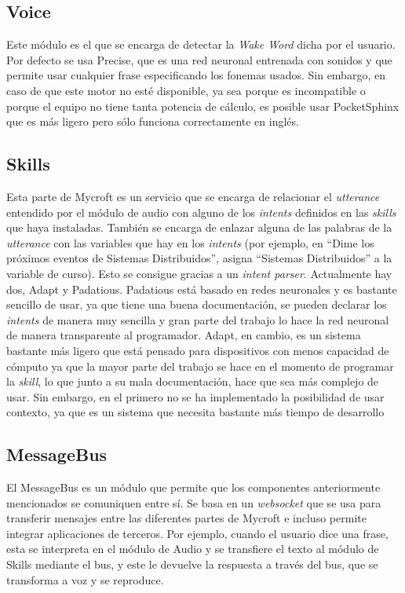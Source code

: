 \subsection{Voice}
Este módulo es el que se encarga de detectar la \textit{Wake Word} dicha por el usuario. Por defecto se usa Precise, que es una red neuronal entrenada con sonidos y que permite usar cualquier frase especificando los fonemas usados. Sin embargo, en caso de que este motor no esté disponible, ya sea porque es incompatible o porque el equipo no tiene tanta potencia de cálculo, es posible usar PocketSphinx que es más ligero pero sólo funciona correctamente en inglés.
\subsection{Skills}
Esta parte de Mycroft es un servicio que se encarga de relacionar el \textit{utterance} entendido por el módulo de audio con alguno de los \textit{intents} definidos en las \textit{skills} que haya instaladas. También se encarga de enlazar alguna de las palabras de la \textit{utterance} con las variables que hay en los \textit{intents} (por ejemplo, en ``Dime los próximos eventos de Sistemas Distribuidos'', asigna ``Sistemas Distribuidos'' a la variable de curso). Esto se consigue gracias a un \textit{intent parser}.
Actualmente hay dos, Adapt y Padatious. Padatious está basado en redes neuronales y es bastante sencillo de usar, ya que tiene una buena documentación, se pueden declarar los \textit{intents} de manera muy sencilla y gran parte del trabajo lo hace la red neuronal de manera transparente al programador. Adapt, en cambio, es un sistema bastante más ligero que está pensado para dispositivos con menos capacidad de cómputo ya que la mayor parte del trabajo se hace en el momento de programar la \textit{skill}, lo que junto a su mala documentación, hace que sea más complejo de usar. Sin embargo, en el primero no se ha implementado la posibilidad de usar contexto, ya que es un sistema que necesita bastante más tiempo de desarrollo
\subsection{MessageBus}
El MessageBus es un módulo que permite que los componentes anteriormente mencionados se comuniquen entre sí. Se basa en un \textit{websocket} que se usa para transferir mensajes entre las diferentes partes de Mycroft e incluso permite integrar aplicaciones de terceros. Por ejemplo, cuando el usuario dice una frase, esta se interpreta en el módulo de Audio y se transfiere el texto al módulo de Skills mediante el bus, y este le devuelve la respuesta a través del bus, que se transforma a voz y se reproduce.


